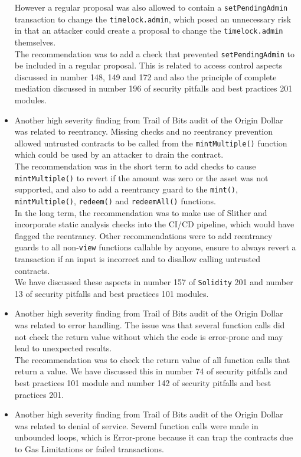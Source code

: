 \begin{itemize}
  However a regular proposal was also allowed to contain a
  \texttt{setPendingAdmin} transaction to change the
  \texttt{timelock.admin}, which posed an unnecessary risk in that an
  attacker could create a proposal to change the \texttt{timelock.admin}
  themselves.\\

  The recommendation was to add a check that prevented
  \texttt{setPendingAdmin} to be included in a regular proposal. This is
  related to access control aspects discussed in number 148, 149 and 172
  and also the principle of complete mediation discussed in number 196
  of security pitfalls and best practices 201 modules.
\item
  Another high severity finding from Trail of Bits audit of the Origin
  Dollar was related to reentrancy. Missing checks and no reentrancy
  prevention allowed untrusted contracts to be called from the
  \texttt{mintMultiple()} function which could be used by an attacker to
  drain the contract.\\

  The recommendation was in the short term to add checks to cause
  \texttt{mintMultiple()} to revert if the amount was zero or the asset
  was not supported, and also to add a reentrancy guard to the
  \texttt{mint()}, \texttt{mintMultiple()}, \texttt{redeem()} and
  \texttt{redeemAll()} functions.\\

  In the long term, the recommendation was to make use of Slither and
  incorporate static analysis checks into the CI/CD pipeline, which
  would have flagged the reentrancy. Other recommendations were to add
  reentrancy guards to all non-\texttt{view} functions callable by
  anyone, ensure to always revert a transaction if an input is incorrect
  and to disallow calling untrusted contracts.\\

  We have discussed these aspects in number 157 of \texttt{Solidity} 201
  and number 13 of security pitfalls and best practices 101 modules.
\item
  Another high severity finding from Trail of Bits audit of the Origin
  Dollar was related to error handling. The issue was that several
  function calls did not check the return value without which the code
  is error-prone and may lead to unexpected results.\\

  The recommendation was to check the return value of all function calls
  that return a value. We have discussed this in number 74 of security
  pitfalls and best practices 101 module and number 142 of security
  pitfalls and best practices 201.
\item
  Another high severity finding from Trail of Bits audit of the Origin
  Dollar was related to denial of service. Several function calls were
  made in unbounded loops, which is Error-prone because it can trap the
  contracts due to Gas Limitations or failed transactions.\\


\end{itemize}
